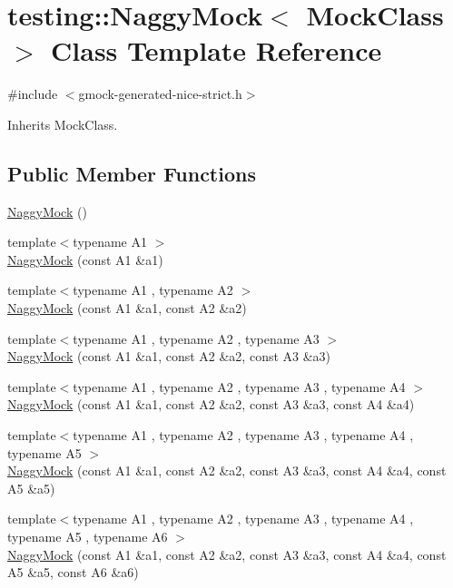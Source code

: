 \hypertarget{classtesting_1_1NaggyMock}{}\section{testing\+::Naggy\+Mock$<$ Mock\+Class $>$ Class Template Reference}
\label{classtesting_1_1NaggyMock}


{\ttfamily \#include $<$gmock-\/generated-\/nice-\/strict.\+h$>$}



Inherits Mock\+Class.

\subsection*{Public Member Functions}
\begin{DoxyCompactItemize}
\item 
\mbox{\hyperlink{classtesting_1_1NaggyMock_acb769f78b93eb60b04db21250f416f70}{Naggy\+Mock}} ()
\item 
{\footnotesize template$<$typename A1 $>$ }\\\mbox{\hyperlink{classtesting_1_1NaggyMock_ae43ea6c6a6b66fe31cb14f93e0be5718}{Naggy\+Mock}} (const A1 \&a1)
\item 
{\footnotesize template$<$typename A1 , typename A2 $>$ }\\\mbox{\hyperlink{classtesting_1_1NaggyMock_a4241363ab2ca3a2e7baa5ead980175e6}{Naggy\+Mock}} (const A1 \&a1, const A2 \&a2)
\item 
{\footnotesize template$<$typename A1 , typename A2 , typename A3 $>$ }\\\mbox{\hyperlink{classtesting_1_1NaggyMock_abd9eea0573bf39f4b41504b2d1df5311}{Naggy\+Mock}} (const A1 \&a1, const A2 \&a2, const A3 \&a3)
\item 
{\footnotesize template$<$typename A1 , typename A2 , typename A3 , typename A4 $>$ }\\\mbox{\hyperlink{classtesting_1_1NaggyMock_aa7d63f62600171db931c6bbb4c2a6d52}{Naggy\+Mock}} (const A1 \&a1, const A2 \&a2, const A3 \&a3, const A4 \&a4)
\item 
{\footnotesize template$<$typename A1 , typename A2 , typename A3 , typename A4 , typename A5 $>$ }\\\mbox{\hyperlink{classtesting_1_1NaggyMock_ac751c8a708935bd8558c9665160f7144}{Naggy\+Mock}} (const A1 \&a1, const A2 \&a2, const A3 \&a3, const A4 \&a4, const A5 \&a5)
\item 
{\footnotesize template$<$typename A1 , typename A2 , typename A3 , typename A4 , typename A5 , typename A6 $>$ }\\\mbox{\hyperlink{classtesting_1_1NaggyMock_aac4c0986e917a5d6e515f8dc0e7bf644}{Naggy\+Mock}} (const A1 \&a1, const A2 \&a2, const A3 \&a3, const A4 \&a4, const A5 \&a5, const A6 \&a6)

\end{DoxyCompactItemize}

